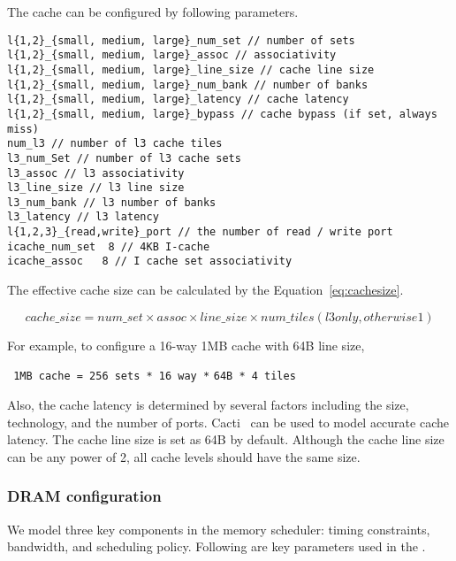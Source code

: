 The cache can be configured by following parameters.

\begin{Verbatim}
l{1,2}_{small, medium, large}_num_set // number of sets
l{1,2}_{small, medium, large}_assoc // associativity
l{1,2}_{small, medium, large}_line_size // cache line size
l{1,2}_{small, medium, large}_num_bank // number of banks  
l{1,2}_{small, medium, large}_latency // cache latency
l{1,2}_{small, medium, large}_bypass // cache bypass (if set, always miss)
num_l3 // number of l3 cache tiles
l3_num_Set // number of l3 cache sets
l3_assoc // l3 associativity
l3_line_size // l3 line size
l3_num_bank // l3 number of banks
l3_latency // l3 latency
l{1,2,3}_{read,write}_port // the number of read / write port
icache_num_set  8 // 4KB I-cache 
icache_assoc   8 // I cache set associativity 
\end{Verbatim}


The effective cache size can be calculated by the
Equation~\ref{eq:cachesize}.

\begin{equation}
\label{eq:cachesize}
cache\_size = num\_set \times assoc \times line\_size \times num\_tiles (l3 only, otherwise 1)
\end{equation}


\noindent
For example, to configure a 16-way 1MB cache with 64B line size,

\Verb+ 1MB cache = 256 sets * 16 way *+ \Verb+64B * 4 tiles+

\noindent
Also, the cache latency is determined by several factors including the
size, technology, and the number of ports. Cacti~\cite{cacti} can be
used to model accurate cache latency. The cache line size is set as
64B by default. Although the cache line size can be any power of 2,
all cache levels should have the same size.


\subsubsection{DRAM configuration}
\label{sec:param-dram}

We model three key components in the memory scheduler: timing
constraints, bandwidth, and scheduling policy. Following are key
parameters used in the \SIM.


